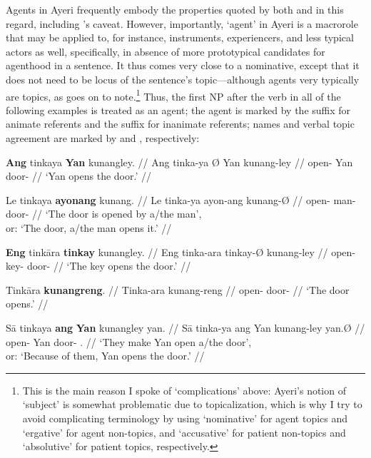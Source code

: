 Agents in Ayeri frequently embody the properties quoted by both 
\citeauthor{fillmore1968} and \citeauthor{payne1997} in this regard, including 
\citeauthor{fillmore1968}'s caveat. However, importantly, `agent' in Ayeri is a 
macrorole that may be applied to, for instance, instruments, experiencers, and 
less typical actors as well, specifically, in absence of more prototypical 
candidates for agenthood in a sentence. It thus comes very close to a 
nominative, except that it does not need to be locus of the sentence's 
topic---although agents very typically are topics, as 
\citet[151]{payne1997} goes on to note.\footnote{This is the main reason I 
spoke of `complications' above: Ayeri's notion of `subject' is somewhat 
problematic due to topicalization, which is why I try to avoid complicating 
terminology by using `nominative' for agent topics and `ergative' for agent 
non-topics, and `accusative' for patient non-topics and `absolutive' for patient 
topics, respectively.} Thus, the first NP after the verb in all of the following 
examples is treated as an agent; the agent is marked by the suffix 
 for animate referents and the suffix  for 
inanimate referents; names and verbal topic agreement are marked by 
 and , respectively:

\pex
\a\begingl
	\gla \textbf{Ang} tinkaya \textbf{{}} \textbf{Yan} kunangley. //
	\glb Ang tinka-ya Ø Yan kunang-ley //
	\glc \AgtT{} open-\TsgM{} \Top{} Yan door-\PargI{} //
	\glft `Yan opens the door.' //
\endgl

\a\begingl
	\gla Le tinkaya \textbf{ayonang} kunang. //
	\glb Le tinka-ya ayon-ang kunang-Ø //
	\glc \PatT{} open-\TsgM{} man-\Aarg{} door-\Top{} //
	\glft `The door is opened by a/the man',\\
		or: `The door, a/the man opens it.' //
\endgl

\a\begingl
	\gla \textbf{Eng} tinkāra \textbf{tinkay} kunangley. //
	\glb Eng tinka-ara tinkay-Ø kunang-ley //
	\glc \AgtTI{} open-\TsgI{} key-\Top{} door-\PargI{} //
	\glft `The key opens the door.' //
\endgl

\a\begingl
	\gla Tinkāra \textbf{kunangreng}. //
	\glb Tinka-ara kunang-reng //
	\glc open-\TsgI{} door-\AargI{} //
	\glft `The door opens.' //
\endgl

\a\begingl
	\gla Sā tinkaya \textbf{ang} \textbf{Yan} kunangley yan. //
	\glb Sā tinka-ya ang Yan kunang-ley yan.Ø //
	\glc \CauT{} open-\TsgM{} \Aarg{} Yan door-\PargI{} \TsgM{}.\Top{} //
	\glft `They make Yan open a/the door',\\
		or: `Because of them, Yan opens the door.' //
\endgl

